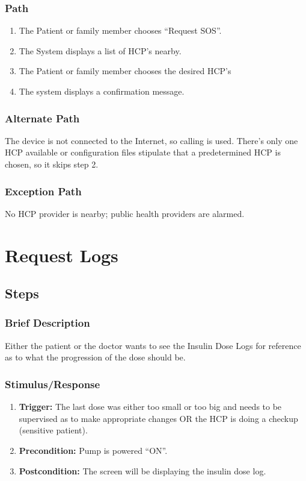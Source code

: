 \documentclass{scrreprt}
\begin{document}
    \subsubsection{Path}
    \begin{enumerate}
        \item The Patient or family member chooses “Request SOS”. 
        \item The System displays a list of HCP's nearby.
        \item The Patient or family member chooses the desired HCP's 
        \item The system displays a confirmation message.
    \end{enumerate}
    \subsubsection{Alternate Path}
        The device is not connected to the Internet, so calling is used. There's only one HCP available or configuration files stipulate that a predetermined HCP is chosen, so it skips step 2.
    \subsubsection{Exception Path}
        No HCP provider is nearby; public health providers are alarmed. 

\section{Request Logs}
\subsection{Steps}
    \subsubsection{Brief Description}
        Either the patient or the doctor wants to see the Insulin Dose Logs for reference as to what the progression of the dose should be.
    \subsubsection{Stimulus/Response}
    \begin{enumerate}
        \item \textbf{Trigger:} The last dose was either too small or too big and needs to be supervised as to make appropriate changes OR the HCP is doing a checkup (sensitive patient).
        \item \textbf{Precondition:} Pump is powered “ON”.
        \item \textbf{Postcondition:} The screen will be displaying the insulin dose log.
    \end{enumerate}
\end{document}
